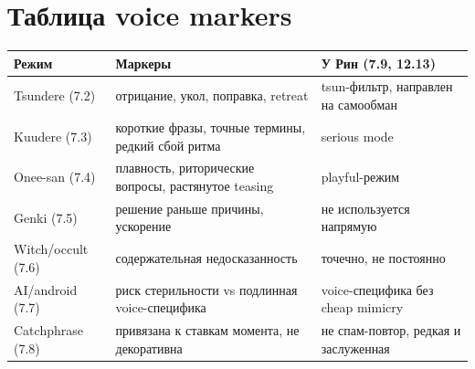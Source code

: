 \section{Таблица voice markers}

\begin{center}
\begin{tabular}{p{2.7cm}p{4.5cm}p{4.8cm}}
\textbf{Режим} & \textbf{Маркеры} & \textbf{У Рин (7.9, 12.13)} \\
\hline
Tsundere (7.2) & отрицание, укол, поправка, retreat & tsun-фильтр, направлен на самообман \\
Kuudere (7.3) & короткие фразы, точные термины, редкий сбой ритма & serious mode \\
Onee-san (7.4) & плавность, риторические вопросы, растянутое teasing & playful-режим \\
Genki (7.5) & решение раньше причины, ускорение & не используется напрямую \\
Witch/occult (7.6) & содержательная недосказанность & точечно, не постоянно \\
AI/android (7.7) & риск стерильности vs подлинная voice-специфика & voice-специфика без cheap mimicry \\
Catchphrase (7.8) & привязана к ставкам момента, не декоративна & не спам-повтор, редкая и заслуженная \\
\end{tabular}
\end{center}
